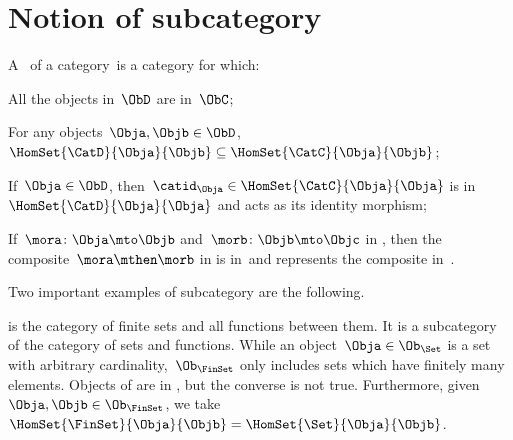 \label{sec:specialization}

\section{Notion of subcategory}
\begin{ctdefinition}[Subcategory]
    \label{def:subcategory}
    A \emph{}~\CatD of a category~\CatC is a category for which:
    \begin{compactenum}
        \item All the objects in~$\ObD$ are in~$\ObC$;
        \item For any objects~$\Obja,\Objb\in \ObD$,~$\HomSet{\CatD}{\Obja}{\Objb}\subseteq \HomSet{\CatC}{ \Obja}{\Objb}$;
        \item If~$\Obja\in \ObD$, then~$\catid_\Obja \in \HomSet{\CatC}{\Obja}{\Obja}$ is in~$\HomSet{\CatD}{\Obja}{\Obja}$ and acts as its identity morphism;
        \item If~$\mora \colon \Obja \mto \Objb$ and~$\morb\colon \Objb\mto \Objc$ in \CatD, then the composite~$\mora \mthen \morb$ in \CatC is in~\CatD and represents the composite in~\CatD.
    \end{compactenum}
\end{ctdefinition}

Two important examples of subcategory are the following.

\begin{example}
    \label{ex:FinSet}
    \iindex{\FinSet} is the category of finite sets and all functions between them.
    It is a subcategory of the category \Set of sets and functions.
    While an object~$\Obja \in \Ob_\Set$ is a set with arbitrary cardinality,~$\Ob_{\FinSet}$ only includes sets which have finitely many elements.
    Objects of \FinSet are in \Set, but the converse is not true.
    Furthermore, given~$\Obja,\Objb\in \Ob_\FinSet$, we take~$\HomSet{\FinSet}{\Obja}{\Objb} =\HomSet{\Set}{\Obja}{\Objb}$.
\end{example}

